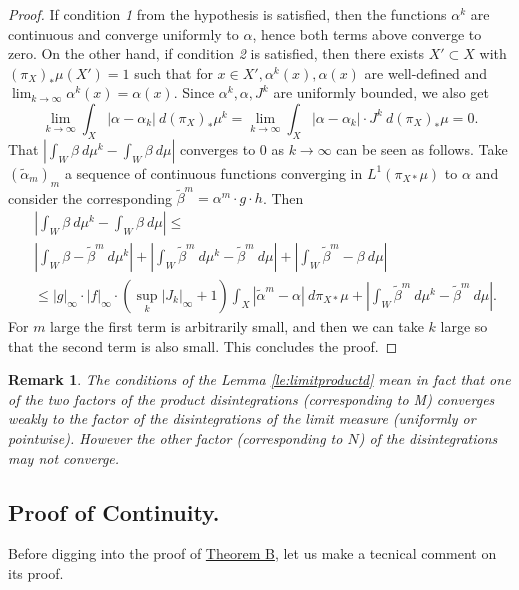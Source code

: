 \documentclass[11pt,letterpaper,reqno]{article}
\newtheorem{remark}{Remark}[section]
\begin{document}
\begin{proof}
If condition \emph{1} from the hypothesis is satisfied, then the functions $\alpha^k$ are continuous and converge uniformly to $\alpha$, hence both terms above converge to zero. On the other hand, if condition \emph{2} is satisfied, then there exists $X'\subset X$ with $(\pi_{X})_*\mu(X')=1$ such that for $x\in X', \alpha^k(x), \alpha(x)$ are well-defined and $\lim_{k\to\infty}\alpha^k(x)=\alpha(x)$. Since $\alpha^k,\alpha, J^k$ are uniformly bounded, we also get
\[
	\lim_{k\rightarrow\infty}\int_X |\alpha-\alpha_k|\ d(\pi_{X})_* \mu^k=\lim_{k\rightarrow\infty}\int_X |\alpha-\alpha_k|\cdot J^k \ d(\pi_{X})_* \mu=0.
\]
That $\left|\int_W \beta\ d\mu^k-\int_W \beta\ d\mu\right|$ converges to $0$ as $k\to\infty$ can be seen as follows. Take $(\tilde\alpha_m)_m$ a sequence of continuous functions converging in $L^1(\pi_{X\ast}\mu)$ to $\alpha$ and consider the corresponding $\tilde \beta^m=\alpha^m\cdot g\cdot h$. Then
\begin{align*}
&\left|\int_W \beta\ d\mu^k-\int_W \beta\ d\mu\right|\leq\\
&\left|\int_W \beta-\tilde\beta^m\ d\mu^k\right|+\left|\int_W \tilde\beta^m\ d\mu^k-\tilde\beta^m\ d\mu\right|+\left|\int_W \tilde\beta^m-\beta\ d\mu\right|\\
&\leq |g|_{\infty}\cdot|f|_{\infty}\cdot(\sup_k|J_k|_{\infty}+1)\int_X|\tilde\alpha^m-\alpha|\ d\pi_{X\ast}\mu+\left|\int_W \tilde\beta^m\ d\mu^k-\tilde\beta^m\ d\mu\right|.
\end{align*}
For $m$ large the first term is arbitrarily small, and then we can take $k$ large so that the second term is also small. This concludes the proof.
\end{proof}

\begin{remark}\label{re:product}
The conditions of the Lemma \ref{le:limitproductd} mean in fact that one of the two factors of the product disintegrations (corresponding to M) converges weakly to the factor of the disintegrations of the limit measure (uniformly or pointwise). However the other factor (corresponding to $N$) of the disintegrations may not converge.
\end{remark}



\subsection{Proof of Continuity.}


Before digging into the proof of \hyperlink{theoremB}{Theorem B}, let us make a tecnical comment on its proof.
\end{document}
